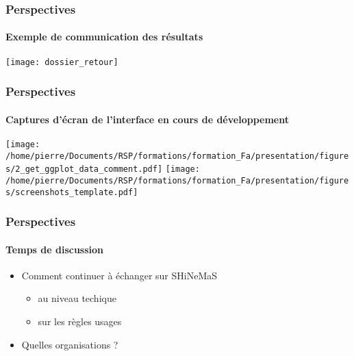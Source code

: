 \begin{frame}
\frametitle{Perspectives}
\framesubtitle{Exemple de communication des résultats}

\begin{center}
\texttt{[image: dossier\_retour]}
\end{center}

\end{frame}


\begin{frame}
\frametitle{Perspectives}
\framesubtitle{Captures d'écran de l'interface en cours de développement}

\begin{center}
\texttt{[image: /home/pierre/Documents/RSP/formations/formation\_Fa/presentation/figures/2\_get\_ggplot\_data\_comment.pdf]}
\texttt{[image: /home/pierre/Documents/RSP/formations/formation\_Fa/presentation/figures/screenshots\_template.pdf]}
\end{center}

\end{frame}


\begin{frame}
\frametitle{Perspectives}
\framesubtitle{Temps de discussion}


\vfill

\begin{itemize}
\item Comment continuer à échanger sur SHiNeMaS 
	\begin{itemize}
	\item au niveau techique
	\item sur les règles usages
	\end{itemize}
\item Quelles organisations ?
\end{itemize}

\end{frame}
